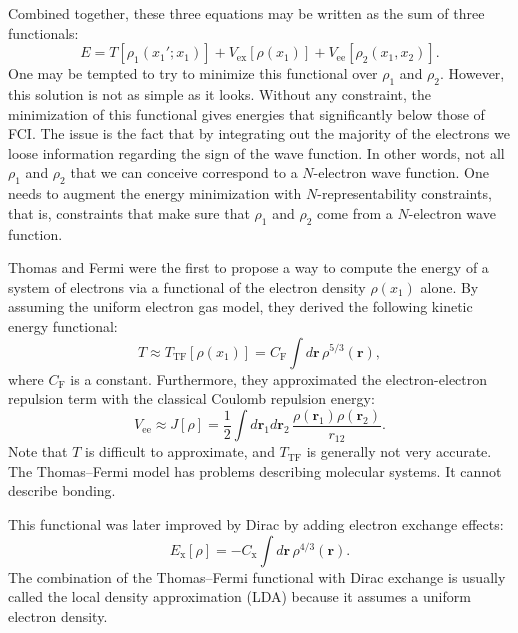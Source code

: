 \documentclass[../Main/chem532-notes.tex]{subfiles}
\begin{document}
Combined together, these three equations may be written as the sum of three functionals:
\begin{equation}
E = T[\rho_1(x_1';x_1)] + V_\mathrm{ex}[\rho(x_1)] + V_\mathrm{ee}[\rho_2(x_1,x_2)].
\end{equation}
One may be tempted to try to minimize this functional over $\rho_1$ and $\rho_2$.
However, this solution is not as simple as it looks.
Without any constraint, the minimization of this functional gives energies that significantly below those of FCI.
The issue is the fact that by integrating out the majority of the electrons we loose information regarding the sign of the wave function.
In other words, not all $\rho_1$ and $\rho_2$ that we can conceive correspond to a $N$-electron wave function.
One needs to augment the energy minimization with $N$-representability constraints, that is, constraints that make sure that $\rho_1$ and $\rho_2$ come from a $N$-electron wave function.

Thomas and Fermi were the first to propose a way to compute the energy of a system of electrons via a functional of the electron density $\rho(x_1)$ alone.
By assuming the uniform electron gas model, they derived the following kinetic energy functional:
\begin{equation}
T \approx T_\mathrm{TF}[\rho(x_1)] = C_\mathrm{F} \int d\mathbf{r}\,\rho^{5/3}(\mathbf{r}),
\end{equation}
where $C_\mathrm{F}$ is a constant.
Furthermore, they approximated the electron-electron repulsion term with the classical Coulomb repulsion energy:
\begin{equation}
V_\mathrm{ee} \approx J[\rho] = \frac{1}{2} \int d\mathbf{r}_1 d\mathbf{r}_2 \, \frac{\rho(\mathbf{r}_1) \rho(\mathbf{r}_2)}{r_{12}}.
\end{equation}
Note that $T$ is difficult to approximate, and $T_\mathrm{TF}$ is generally not very accurate.
The Thomas--Fermi model has problems describing molecular systems. It cannot describe bonding.

This functional was later improved by Dirac by adding electron exchange effects:
\begin{equation}
E_\mathrm{x}[\rho] = -C_\mathrm{x} \int d\mathbf{r}\,\rho^{4/3}(\mathbf{r}).
\end{equation}
The combination of the Thomas--Fermi functional with Dirac exchange is usually called the local density approximation (LDA) because it assumes a uniform electron density.
\end{document}
